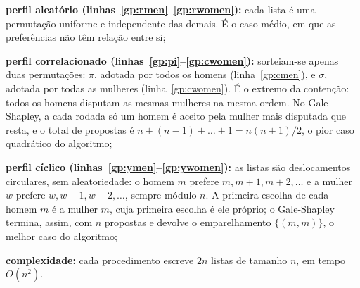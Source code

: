 \begin{algorithm}[H]
    \DontPrintSemicolon
    \SetAlgoLined

    \caption{Geradores de perfis de preferência para o casamento estável}
    \label{alg:gen_pref}


    \bigskip


    \bigskip

\end{algorithm}

\begin{alineas}
    \item \textbf{perfil aleatório (linhas~\ref{gp:rmen}--\ref{gp:rwomen}):} cada lista é uma permutação uniforme e independente das demais. É o caso médio, em que as preferências não têm relação entre si;
    \item \textbf{perfil correlacionado (linhas~\ref{gp:pi}--\ref{gp:cwomen}):} sorteiam-se apenas duas permutações: $\pi$, adotada por todos os homens (linha~\ref{gp:cmen}), e $\sigma$, adotada por todas as mulheres (linha~\ref{gp:cwomen}). É o extremo da contenção: todos os homens disputam as mesmas mulheres na mesma ordem. No Gale-Shapley, a cada rodada só um homem é aceito pela mulher mais disputada que resta, e o total de propostas é $n + (n-1) + \dots + 1 = n(n+1)/2$, o pior caso quadrático do algoritmo;
    \item \textbf{perfil cíclico (linhas~\ref{gp:ymen}--\ref{gp:ywomen}):} as listas são deslocamentos circulares, sem aleatoriedade: o homem $m$ prefere $m, m+1, m+2, \dots$ e a mulher $w$ prefere $w, w-1, w-2, \dots$, sempre módulo $n$. A primeira escolha de cada homem $m$ é a mulher $m$, cuja primeira escolha é ele próprio; o Gale-Shapley termina, assim, com $n$ propostas e devolve o emparelhamento $\{(m, m)\}$, o melhor caso do algoritmo;
    \item \textbf{complexidade:} cada procedimento escreve $2n$ listas de tamanho $n$, em tempo $O(n^2)$.
\end{alineas}

